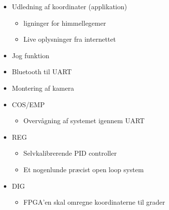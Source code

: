 \begin{itemize}[noitemsep]
	\item Udledning af koordinater (applikation)
	\begin{itemize}[noitemsep]
		\item ligninger for himmellegemer
		\item Live oplysninger fra internettet
	\end{itemize}
	\item Jog funktion
	\item Bluetooth til UART
	\item Montering af kamera
	
	\item COS/EMP
	\begin{itemize}[noitemsep]
		\item Overvågning af systemet igennem UART
	\end{itemize}
	\item REG
	\begin{itemize}[noitemsep]
		\item Selvkalibrerende PID controller
		\item Et nogenlunde præcist open loop system
	\end{itemize}
	\item DIG
	\begin{itemize}[noitemsep]
		\item FPGA'en skal omregne koordinaterne til grader
	\end{itemize}		
\end{itemize}